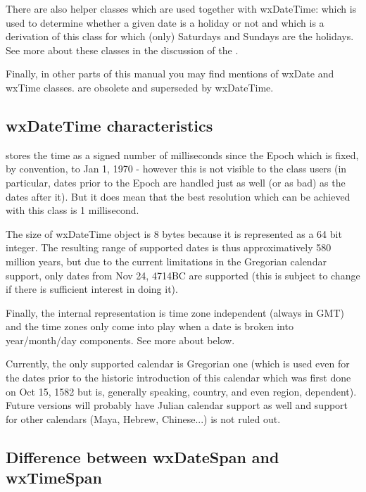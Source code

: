 There are also helper classes which are used together with wxDateTime: 
 which is used
to determine whether a given date is a holiday or not and 
 which is a derivation of this
class for which (only) Saturdays and Sundays are the holidays. See more about
these classes in the discussion of the .

Finally, in other parts of this manual you may find mentions of wxDate and
wxTime classes.  are obsolete and
superseded by wxDateTime.

\subsection{wxDateTime characteristics}\label{wxdatetimecharacteristics}

 stores the time as a signed number of
milliseconds since the Epoch which is fixed, by convention, to Jan 1, 1970 -
however this is not visible to the class users (in particular, dates prior to
the Epoch are handled just as well (or as bad) as the dates after it). But it
does mean that the best resolution which can be achieved with this class is 1
millisecond.

The size of wxDateTime object is 8 bytes because it is represented as a 64 bit
integer. The resulting range of supported dates is thus approximatively 580
million years, but due to the current limitations in the Gregorian calendar
support, only dates from Nov 24, 4714BC are supported (this is subject to
change if there is sufficient interest in doing it).

Finally, the internal representation is time zone independent (always in GMT)
and the time zones only come into play when a date is broken into
year/month/day components. See more about  
below.

Currently, the only supported calendar is Gregorian one (which is used even
for the dates prior to the historic introduction of this calendar which was
first done on Oct 15, 1582 but is, generally speaking, country, and even
region, dependent). Future versions will probably have Julian calendar support
as well and support for other calendars (Maya, Hebrew, Chinese...) is not
ruled out.

\subsection{Difference between wxDateSpan and wxTimeSpan}\label{dateandtimespansdifference}

